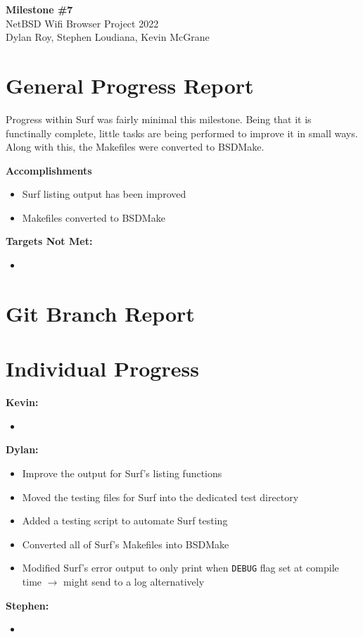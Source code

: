 \documentclass[11pt]{article}
\begin{document}
\begin{center}
  \textbf{\Large Milestone \#7}\\\large NetBSD Wifi Browser Project 2022\\
  Dylan Roy, Stephen Loudiana, Kevin McGrane
\end{center}


\section{General Progress Report}
Progress within Surf was fairly minimal this milestone. Being that it
is functinally complete, little tasks are being performed to improve
it in small ways. Along with this, the Makefiles were converted to BSDMake.

\textbf{Accomplishments}
\begin{itemize}
  \item Surf listing output has been improved
  \item Makefiles converted to BSDMake
\end{itemize}

\textbf{Targets Not Met:}
\begin{itemize}
  \item 
\end{itemize}


\section{Git Branch Report}

\newpage
\section{Individual Progress}

\textbf{Kevin:}
\begin{itemize}
  \item
\end{itemize}

\textbf{Dylan:}
\begin{itemize}
  \item Improve the output for Surf's listing functions
  \item Moved the testing files for Surf into the dedicated test directory
  \item Added a testing script to automate Surf testing
  \item Converted all of Surf's Makefiles into BSDMake
  \item Modified Surf's error output to only print when \texttt{DEBUG} flag set
    at compile time $\rightarrow$ might send to a log alternatively
\end{itemize}

\textbf{Stephen:}
\begin{itemize}
  \item
\end{itemize}
\end{document}
